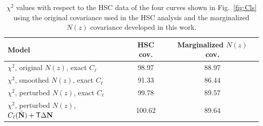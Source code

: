 \documentclass[a4paper,11pt]{article}
\newcommand{\vN}{\mathbf{N}}
\begin{document}
      \begin{table}
        \begin{center}
          \begin{tabular}{l| c c }
            \hline\hline
            Model & HSC cov. & Marginalized $N(z)$ cov. \\ [0.5ex]
            \hline
            $\chi^2$, original $N(z)$, exact $C_\ell$ & 98.97 & 88.97 \\ 
            $\chi^2$, smoothed $N(z)$, exact $C_\ell$ & 91.33 & 86.44 \\
            $\chi^2$, perturbed $N(z)$, exact $C_\ell$ & 99.78 & 89.57 \\
            $\chi^2$, perturbed $N(z)$, $C_\ell(\bar{\vN}) + {\sf T} \Delta \vN$ & 100.62 & 89.64 \\
            \hline
            \hline
          \end{tabular}
        \end{center}
        \caption{$\chi^2$ values with respect to the HSC data of the four curves shown in Fig.~\ref{fig:Cls} using the original covariance used in the HSC analysis and the marginalized $N(z)$ covariance developed in this work.}\label{tab:lin}
      \end{table}
\end{document}
